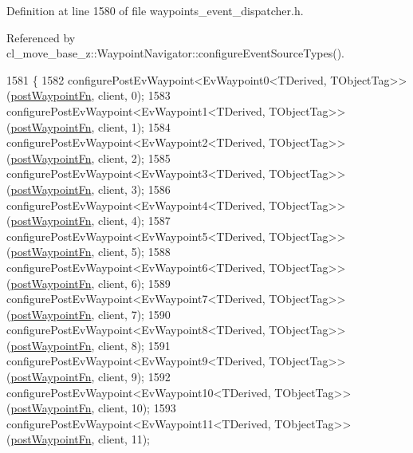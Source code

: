 Definition at line 1580 of file waypoints\+\_\+event\+\_\+dispatcher.\+h.



Referenced by cl\+\_\+move\+\_\+base\+\_\+z\+::\+Waypoint\+Navigator\+::configure\+Event\+Source\+Types().


\begin{DoxyCode}
1581 \{
1582     configurePostEvWaypoint<EvWaypoint0<TDerived, TObjectTag>>(\hyperlink{classcl__move__base__z_1_1WaypointEventDispatcher_a964a57fcce5d48ec60243230722d8dd7}{postWaypointFn}, client, 0);
1583     configurePostEvWaypoint<EvWaypoint1<TDerived, TObjectTag>>(\hyperlink{classcl__move__base__z_1_1WaypointEventDispatcher_a964a57fcce5d48ec60243230722d8dd7}{postWaypointFn}, client, 1);
1584     configurePostEvWaypoint<EvWaypoint2<TDerived, TObjectTag>>(\hyperlink{classcl__move__base__z_1_1WaypointEventDispatcher_a964a57fcce5d48ec60243230722d8dd7}{postWaypointFn}, client, 2);
1585     configurePostEvWaypoint<EvWaypoint3<TDerived, TObjectTag>>(\hyperlink{classcl__move__base__z_1_1WaypointEventDispatcher_a964a57fcce5d48ec60243230722d8dd7}{postWaypointFn}, client, 3);
1586     configurePostEvWaypoint<EvWaypoint4<TDerived, TObjectTag>>(\hyperlink{classcl__move__base__z_1_1WaypointEventDispatcher_a964a57fcce5d48ec60243230722d8dd7}{postWaypointFn}, client, 4);
1587     configurePostEvWaypoint<EvWaypoint5<TDerived, TObjectTag>>(\hyperlink{classcl__move__base__z_1_1WaypointEventDispatcher_a964a57fcce5d48ec60243230722d8dd7}{postWaypointFn}, client, 5);
1588     configurePostEvWaypoint<EvWaypoint6<TDerived, TObjectTag>>(\hyperlink{classcl__move__base__z_1_1WaypointEventDispatcher_a964a57fcce5d48ec60243230722d8dd7}{postWaypointFn}, client, 6);
1589     configurePostEvWaypoint<EvWaypoint7<TDerived, TObjectTag>>(\hyperlink{classcl__move__base__z_1_1WaypointEventDispatcher_a964a57fcce5d48ec60243230722d8dd7}{postWaypointFn}, client, 7);
1590     configurePostEvWaypoint<EvWaypoint8<TDerived, TObjectTag>>(\hyperlink{classcl__move__base__z_1_1WaypointEventDispatcher_a964a57fcce5d48ec60243230722d8dd7}{postWaypointFn}, client, 8);
1591     configurePostEvWaypoint<EvWaypoint9<TDerived, TObjectTag>>(\hyperlink{classcl__move__base__z_1_1WaypointEventDispatcher_a964a57fcce5d48ec60243230722d8dd7}{postWaypointFn}, client, 9);
1592     configurePostEvWaypoint<EvWaypoint10<TDerived, TObjectTag>>(\hyperlink{classcl__move__base__z_1_1WaypointEventDispatcher_a964a57fcce5d48ec60243230722d8dd7}{postWaypointFn}, client, 10);
1593     configurePostEvWaypoint<EvWaypoint11<TDerived, TObjectTag>>(\hyperlink{classcl__move__base__z_1_1WaypointEventDispatcher_a964a57fcce5d48ec60243230722d8dd7}{postWaypointFn}, client, 11);

\end{DoxyCode}
